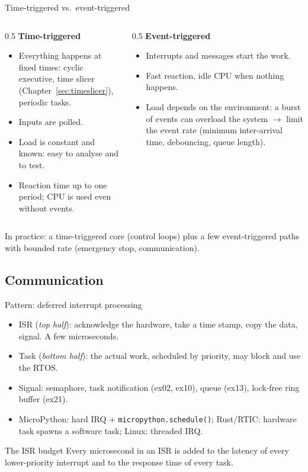 \begin{frame}{Time-triggered vs.\ event-triggered}
  \begin{columns}[T]
    \begin{column}{0.5\textwidth}
      \textbf{Time-triggered}
      \begin{itemize}\small
        \item Everything happens at fixed times: cyclic executive, time slicer (Chapter~\ref{sec:timeslicer}), periodic tasks.
        \item Inputs are polled.
        \item Load is constant and known: easy to analyse and to test.
        \item Reaction time up to one period; CPU is used even without events.
      \end{itemize}
    \end{column}
    \begin{column}{0.5\textwidth}
      \textbf{Event-triggered}
      \begin{itemize}\small
        \item Interrupts and messages start the work.
        \item Fast reaction, idle CPU when nothing happens.
        \item Load depends on the environment: a burst of events can overload the system $\rightarrow$ limit the event rate (minimum inter-arrival time, debouncing, queue length).
      \end{itemize}
    \end{column}
  \end{columns}
  \medskip
  In practice: a time-triggered core (control loops) plus a few event-triggered paths with bounded rate (emergency stop, communication).
\end{frame}

\subsection{Communication}
\begin{frame}{Pattern: deferred interrupt processing}
  \begin{itemize}
    \item ISR (\emph{top half}): acknowledge the hardware, take a time stamp, copy the data, signal. A few microseconds.
    \item Task (\emph{bottom half}): the actual work, scheduled by priority, may block and use the RTOS.
    \item Signal: semaphore, task notification (ex02, ex10), queue (ex13), lock-free ring buffer (ex21).
    \item MicroPython: hard IRQ $+$ \texttt{micropython.schedule()}; Rust/RTIC: hardware task spawns a software task; Linux: threaded IRQ.
  \end{itemize}
  \begin{alertblock}{The ISR budget}
    Every microsecond in an ISR is added to the latency of every lower-priority interrupt and to the response time of every task.
  \end{alertblock}
\end{frame}

